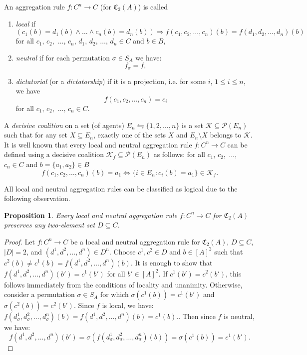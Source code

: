 \documentclass[graybox]{SNmult}
\newtheorem{prop}{Proposition}
\theoremstyle{definition}
\begin{document}
\par  An aggregation rule $f: C^n\to C$ (for $\mathfrak C_2(A)$) is called
\begin{enumerate}
	\item \textit{local} if $$(c_1(b)=d_1(b)\wedge \ldots\wedge c_n(b)=d_n(b))\Rightarrow f(c_1, c_2, \ldots, c_n)(b)=f(d_1, d_2, \ldots, d_n)(b)$$ %
	for all $c_1$, $c_2$,~$\ldots$, $c_n$, $d_1$, $d_2$, $\ldots$, $d_n\in C$ and $b\in B$,
	\item  \textit{neutral} if for each permutation $\sigma\in S_A$ we have: $$f_\sigma=f,$$
	\item \textit{dictatorial} (or a \textit{dictatorship}) if it is a projection, i.e. for some $i$, $1\leq i\leq n$, we have
	$$
	f(c_1, c_2, \ldots, c_n)=c_i
	$$
	for all $c_1$, $c_2$,~$\ldots$, $c_n\in C$.
\end{enumerate}
\par A \textit{decisive coalition} on a set (of agents) $E_n\leftrightharpoons\{1, 2, \ldots, n\}$ is a set $\mathscr K\subseteq \mathscr P(E_n)$ such that for any set $X\subseteq E_n$, exactly one of the sets $X$ and $E_n\setminus X$ belongs to $\mathscr K$. It is well known that every local and neutral aggregation rule $f:C^n\to C$ can be defined using a decisive coalition $\mathscr K_f\subseteq \mathscr P(E_n)$ as follows: for all $c_1$, $c_2$,~$\ldots$, $c_n\in C$ and $b=\{a_1, a_2\}\in B$
$$
f(c_1, c_2, \ldots, c_n)(b)=a_1\Leftrightarrow \{i\in E_n: c_i(b)=a_1\}\in \mathscr K_f.
$$
\par All local and neutral aggregation rules can be classified as logical due to the following observation.
\begin{prop}\label{PropNeutrality}
	Every local and neutral aggregation rule $f:C^n\to C$ for $\mathfrak C_2(A)$ preserves any two-element set $D\subseteq C$.
\end{prop}
\begin{proof}
	Let $f:C^n\to C$ be a local and neutral aggregation rule for $\mathfrak C_2(A)$, $D\subseteq C$, $|D|=2$, and $(d^1, d^2, \ldots, d^n)\in D^n$. Choose $c^1, c^2\in D$ and $b\in [A]^2$ such that $c^2(b)\neq c^1(b)=f(d^1, d^2, \ldots, d^n)(b)$. It is enough to show that $f(d^1, d^2, \ldots, d^n)(b')=c^1(b')$ for all $b'\in [A]^2$. If $c^1(b')=c^2(b')$, this follows immediately from the conditions of locality and unanimity. Otherwise, consider a permutation $\sigma\in S_A$ for which $\sigma(c^1(b))=c^1(b')$ and $\sigma(c^2(b))=c^2(b')$. Since $f$ is local, we have:
	$
	f(d^1_\sigma, d^2_\sigma, \ldots, d^n_\sigma)(b)= f(d^1, d^2, \ldots, d^n)(b)=c^1(b).
	$.
	Then since $f$ is neutral, we have:
	$$
	f(d^1, d^2, \ldots, d^n)(b')=\sigma(f(d^1_\sigma, d^2_\sigma, \ldots, d^n_\sigma)(b))=\sigma(c^1(b))=c^1(b').
	$$
\end{proof}
\end{document}
